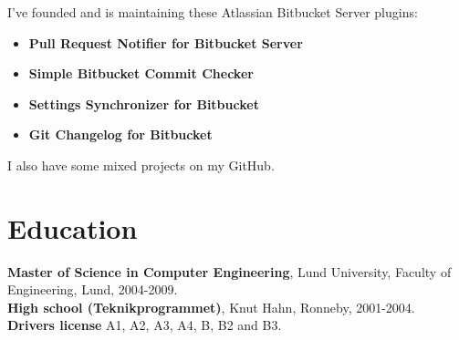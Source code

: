 \documentclass[a4paper]{article}
\begin{document}
I've founded and is maintaining these Atlassian Bitbucket Server plugins:

\begin{itemize}
 \item \textbf{Pull Request Notifier for Bitbucket Server}
 \item \textbf{Simple Bitbucket Commit Checker}
 \item \textbf{Settings Synchronizer for Bitbucket}
 \item \textbf{Git Changelog for Bitbucket}
\end{itemize}

I also have some mixed projects on my GitHub.


\section*{Education}
\textbf{Master of Science in Computer Engineering}, Lund University, Faculty of Engineering, Lund, 2004-2009. \\
\textbf{High school (Teknikprogrammet)}, Knut Hahn, Ronneby, 2001-2004. \\
\textbf{Drivers license} A1, A2, A3, A4, B, B2 and B3. \\
\newpage
\end{document}
